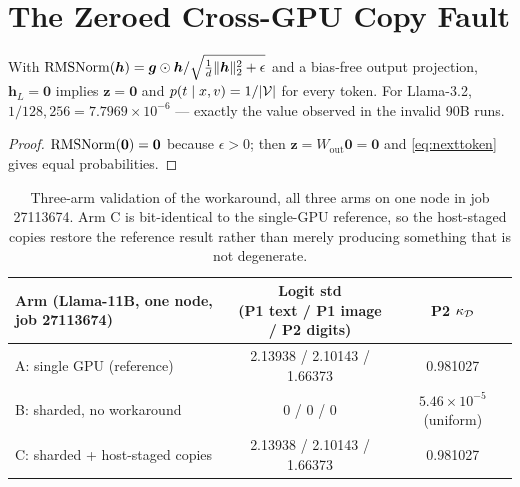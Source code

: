 \chapter{The Zeroed Cross-GPU Copy Fault}\label{app:fault}


\begin{proposition}\label{prop:uniform}
\leavevmode\par
With $\operatorname{RMSNorm}(\bm h)=\bm g\odot\bm h/\sqrt{\tfrac1d\lVert\bm h\rVert_2^2+\epsilon}$
\cite{zhang2019rmsnorm} and a bias-free output projection, $\bm h_L=\bm 0$
implies $\bm z=\bm 0$ and $p(t\mid x,v)=1/|\mathcal{V}|$ for every token. For
Llama-3.2, $1/128{,}256=7.7969\times10^{-6}$ --- exactly the value observed in
the invalid 90B runs.
\end{proposition}
\begin{proof}
$\operatorname{RMSNorm}(\bm 0)=\bm 0$ because $\epsilon>0$; then $\bm z=W_{\text{out}}\bm 0=\bm 0$
and \cref{eq:nexttoken} gives equal probabilities.
\end{proof}

\begin{table}[htbp]\centering\small
\begin{tabularx}{\linewidth}{@{}>{\raggedright\arraybackslash}Xcc@{}}
\toprule
Arm (Llama-11B, one node, job 27113674) & \makecell{Logit std\\(P1 text / P1 image / P2 digits)} & P2 $\kappa_{\mathcal{D}}$ \\
\midrule
A: single GPU (reference) & 2.13938 / 2.10143 / 1.66373 & 0.981027 \\
B: sharded, no workaround & 0 / 0 / 0 & $5.46\times10^{-5}$ (uniform) \\
C: sharded + host-staged copies & 2.13938 / 2.10143 / 1.66373 & 0.981027 \\
\bottomrule
\end{tabularx}
\caption{Three-arm validation of the workaround, all three arms on one node in
job 27113674. Arm C is bit-identical to the single-GPU reference, so the
host-staged copies restore the reference result rather than merely producing
something that is not degenerate.}
\label{tab:app-fault}
\end{table}

